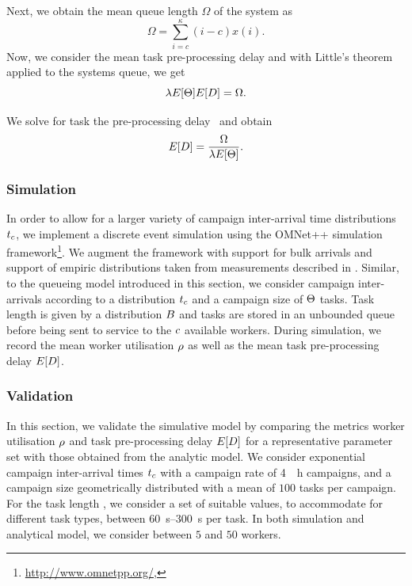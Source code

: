 Next, we obtain the mean queue length \(\Omega\) of the system as
\[
	\Omega = \sum_{i = c}^\kappa (i - c) x(i).
\]
Now, we consider the mean task pre-processing delay \preTaskProcessingDelay and with Little's theorem applied to the systems queue, we get
\[\lambda E[\Theta] E[D] = \Omega.\]

We solve for task the pre-processing delay \preTaskProcessingDelay~and obtain
\[E[D] = \frac{\Omega}{\lambda E[\Theta]}.\]

\subsubsection*{Simulation}

In order to allow for a larger variety of campaign inter-arrival time distributions \(t_c\), we implement a discrete event simulation using the OMNet++ simulation framework\footnote{\url{http://www.omnetpp.org/}, \accessed}.
We augment the framework with support for bulk arrivals and support of empiric distributions taken from measurements described in .
Similar, to the queueing model introduced in this section, we consider campaign inter-arrivals according to a distribution \(t_c\) and a campaign size of \(\Theta\) tasks.
Task length is given by a distribution \(B\) and tasks are stored in an unbounded queue before being sent to service to the \(c\) available workers.
During simulation, we record the mean worker utilisation \(\rho\) as well as the mean task pre-processing delay \(E[D]\).

\subsubsection*{Validation}

In this section, we validate the simulative model by comparing the metrics worker utilisation \(\rho\) and task pre-processing delay \(E[D]\) for a representative parameter set with those obtained from the analytic model.
We consider exponential campaign inter-arrival times \(t_c\) with a campaign rate of \SI{4}{\per\hour} campaigns, and a campaign size \campaignSize geometrically distributed with a mean of \(100\) tasks per campaign.
For the task length \taskDuration, we consider a set of suitable values, to accommodate for different task types, between \SIrange{60}{300}{\second} per task.
In both simulation and analytical model, we consider between \(5\) and \(50\) workers.

